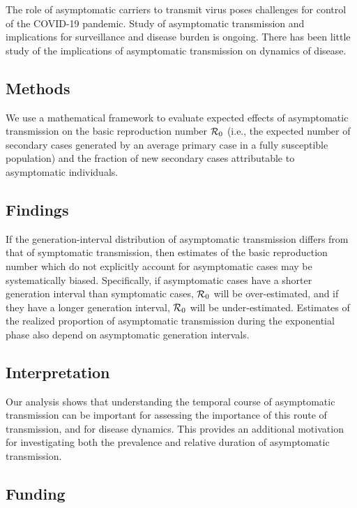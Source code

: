 \documentclass[12pt]{article}
\begin{document}
The role of asymptomatic carriers to transmit virus poses challenges for control of the COVID-19 pandemic. 
Study of asymptomatic transmission and implications for surveillance and disease burden is ongoing. 
There has been little study of the implications of asymptomatic transmission on dynamics of disease.

\subsection*{Methods}

We use a mathematical framework to evaluate expected effects of asymptomatic transmission on the basic reproduction number ${\cal{R}}_0$ (i.e., the expected number of secondary cases generated by an average primary case in a fully susceptible population) and the fraction of new secondary cases attributable to asymptomatic individuals.

\subsection*{Findings}

If the generation-interval distribution of asymptomatic transmission differs from that of symptomatic transmission, then estimates of the basic reproduction number which do not explicitly account for asymptomatic cases may be systematically biased. 
Specifically, if asymptomatic cases have a shorter generation interval than symptomatic cases, ${\cal{R}}_0$ will be over-estimated, and if they have a longer generation interval, ${\cal{R}}_0$ will be under-estimated.
Estimates of the realized proportion of asymptomatic transmission during the exponential phase also depend on asymptomatic generation intervals.

\subsection*{Interpretation}

Our analysis shows that understanding the temporal course of asymptomatic transmission can be important for assessing the importance of this route of transmission, and for disease dynamics. This provides an additional motivation for investigating both the prevalence and relative duration of asymptomatic transmission. 

\subsection*{Funding}
\end{document}
